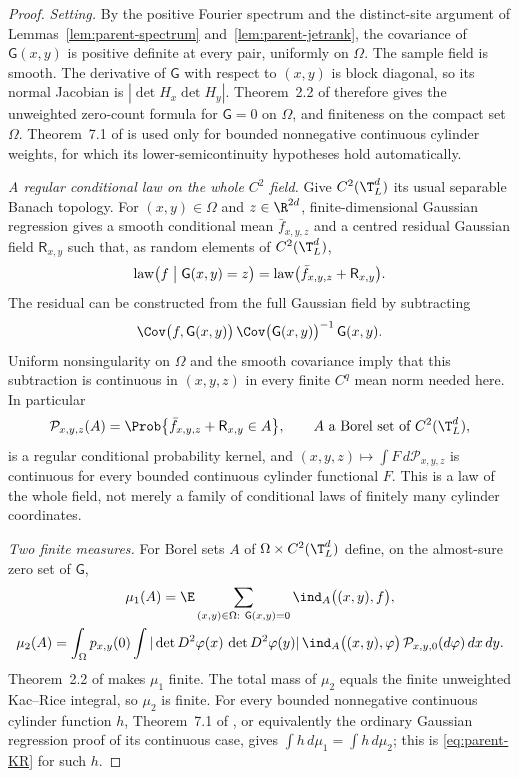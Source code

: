 \begin{proof}
\emph{Setting.} By the positive Fourier spectrum and the distinct-site argument of Lemmas~\ref{lem:parent-spectrum} and~\ref{lem:parent-jetrank}, the covariance of $\mathsf G(x,y)$ is positive definite at every pair, uniformly on $\Omega$. The sample field is smooth. The derivative of $\mathsf G$ with respect to $(x,y)$ is block diagonal, so its normal Jacobian is $|\det H_x\det H_y|$. Theorem~2.2 of \cite{AAL} therefore gives the unweighted zero-count formula for $\mathsf G=0$ on $\Omega$, and finiteness on the compact set $\Omega$. Theorem~7.1 of \cite{AAL} is used only for bounded nonnegative continuous cylinder weights, for which its lower-semicontinuity hypotheses hold automatically.

\emph{A regular conditional law on the whole $C^2$ field.} Give $C^2(\T^d_L)$ its usual separable Banach topology. For $(x,y)\in\Omega$ and $z\in\R^{2d}$, finite-dimensional Gaussian regression gives a smooth conditional mean $\bar f_{x,y,z}$ and a centred residual Gaussian field $\mathsf R_{x,y}$ such that, as random elements of $C^2(\T^d_L)$,
\[
\operatorname{law}\bigl(f\bigm|\mathsf G(x,y)=z\bigr)=\operatorname{law}\bigl(\bar f_{x,y,z}+\mathsf R_{x,y}\bigr).
\]
The residual can be constructed from the full Gaussian field by subtracting
\[
\Cov\bigl(f,\mathsf G(x,y)\bigr)\,\Cov\bigl(\mathsf G(x,y)\bigr)^{-1}\,\mathsf G(x,y).
\]
Uniform nonsingularity on $\Omega$ and the smooth covariance imply that this subtraction is continuous in $(x,y,z)$ in every finite $C^q$ mean norm needed here. In particular
\[
\mathcal P_{x,y,z}(A)=\Prob\bigl\{\bar f_{x,y,z}+\mathsf R_{x,y}\in A\bigr\},\qquad A\ \text{a Borel set of}\ C^2(\T^d_L),
\]
is a regular conditional probability kernel, and $(x,y,z)\mapsto\int F\,d\mathcal P_{x,y,z}$ is continuous for every bounded continuous cylinder functional $F$. This is a law of the whole field, not merely a family of conditional laws of finitely many cylinder coordinates.

\emph{Two finite measures.} For Borel sets $A$ of $\Omega\times C^2(\T^d_L)$ define, on the almost-sure zero set of $\mathsf G$,
\begin{gather*}
\mu_1(A)=\E\sum_{(x,y)\in\Omega:\ \mathsf G(x,y)=0}\ind_A\bigl((x,y),f\bigr),\\
\mu_2(A)=\int_\Omega p_{x,y}(0)\int|\det D^2\varphi(x)\,\det D^2\varphi(y)|\,\ind_A\bigl((x,y),\varphi\bigr)\,\mathcal P_{x,y,0}(d\varphi)\,dx\,dy .
\end{gather*}
Theorem~2.2 of \cite{AAL} makes $\mu_1$ finite. The total mass of $\mu_2$ equals the finite unweighted Kac--Rice integral, so $\mu_2$ is finite. For every bounded nonnegative continuous cylinder function $h$, Theorem~7.1 of \cite{AAL}, or equivalently the ordinary Gaussian regression proof of its continuous case, gives $\int h\,d\mu_1=\int h\,d\mu_2$; this is \eqref{eq:parent-KR} for such $h$.


\end{proof}
